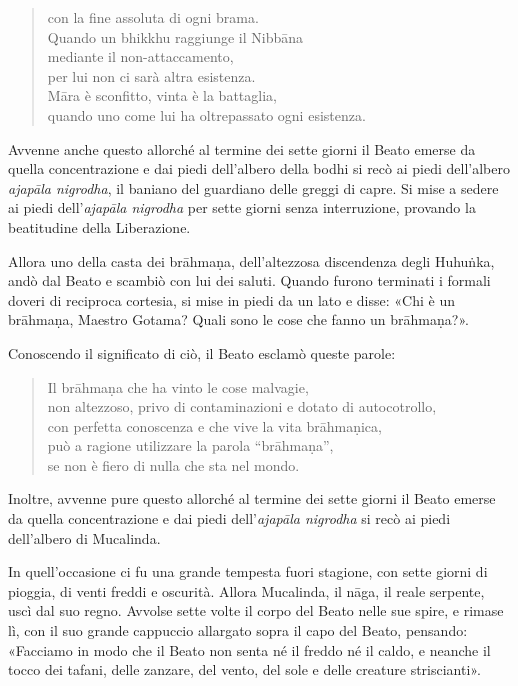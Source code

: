 \begin{quote}
con la fine assoluta di ogni brama. \\
Quando un bhikkhu raggiunge il Nibbāna \\
mediante il non-attaccamento, \\
per lui non ci sarà altra esistenza. \\
Māra è sconfitto, vinta è la battaglia, \\
quando uno come lui ha oltrepassato ogni esistenza.
\end{quote}



 Avvenne anche questo allorché al termine dei sette giorni
il Beato emerse da quella concentrazione e dai piedi dell’albero della
bodhi si recò ai piedi dell’albero \emph{ajapāla nigrodha}, il baniano del
guardiano delle greggi di capre. Si mise a sedere ai piedi dell’\emph{ajapāla
nigrodha} per sette giorni senza interruzione, provando la beatitudine
della Liberazione.


Allora uno della casta dei brāhmaṇa, dell’altezzosa discendenza degli
Huhuṅka, andò dal Beato e scambiò con lui dei saluti. Quando furono
terminati i formali doveri di reciproca cortesia, si mise in piedi da un
lato e disse: «Chi è un brāhmaṇa, Maestro Gotama? Quali sono le cose che
fanno un brāhmaṇa?».


Conoscendo il significato di ciò, il Beato esclamò queste parole:


\begin{quote}
Il brāhmaṇa che ha vinto le cose malvagie, \\
non altezzoso, privo di contaminazioni e dotato di autocotrollo, \\
con perfetta conoscenza e che vive la vita brāhmaṇica, \\
può a ragione utilizzare la parola “brāhmaṇa”, \\
se non è fiero di nulla che sta nel mondo.
\end{quote}



Inoltre, avvenne pure questo allorché al termine dei sette giorni il
Beato emerse da quella concentrazione e dai piedi dell’\emph{ajapāla
nigrodha} si recò ai piedi dell’albero di Mucalinda.


In quell’occasione ci fu una grande tempesta fuori stagione, con sette
giorni di pioggia, di venti freddi e oscurità. Allora Mucalinda, il
nāga, il reale serpente, uscì dal suo regno. Avvolse sette volte il
corpo del Beato nelle sue spire, e rimase lì, con il suo grande
cappuccio allargato sopra il capo del Beato, pensando: «Facciamo in modo
che il Beato non senta né il freddo né il caldo, e neanche il tocco dei
tafani, delle zanzare, del vento, del sole e delle creature
striscianti».


